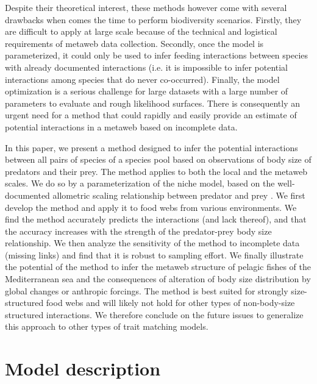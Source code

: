 \documentclass[12pt]{article}
\begin{document}
Despite their theoretical interest, these methods however come with several
drawbacks when comes the time to perform biodiversity scenarios. Firstly, they
are difficult to apply at large scale because of the technical and logistical
requirements of metaweb data collection. Secondly, once the model is
parameterized, it could only be used to infer feeding interactions between
species with already documented interactions (i.e. it is impossible to infer
potential interactions among species that do never co-occurred). Finally, the
model optimization is a serious challenge for large datasets with a large number
of parameters to evaluate and rough likelihood surfaces. There is consequently
an urgent need for a method that could rapidly and easily provide an estimate of
potential interactions in a metaweb based on incomplete data.

In this paper, we present a method designed to infer the potential interactions
between all pairs of species of a species pool based on observations of body
size of predators and their prey. The method applies to both the local and the
metaweb scales. We do so by a parameterization of the niche model, based on the
well-documented allometric scaling relationship between predator and prey
\parencite{Cohen2003, Brose2006, Riede2010}. We first develop the method and
apply it to food webs from various environments. We find the method accurately
predicts the interactions (and lack thereof), and that the accuracy increases
with the strength of the predator-prey body size relationship. We then analyze
the sensitivity of the method to incomplete data (missing links) and find that
it is robust to sampling effort. We finally illustrate the potential of the
method to infer the metaweb structure of pelagic fishes of the Mediterranean
sea and the consequences of alteration of body size distribution by global
changes or anthropic forcings. The method is best suited for strongly
size-structured food webs and will likely not hold for other types of
non-body-size structured interactions. We therefore conclude on the future
issues to generalize this approach to other types of trait matching models.

\section{Model description}
\end{document}
